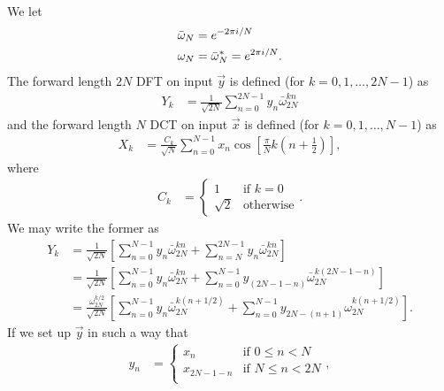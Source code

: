 We let
\begin{subequations}
\begin{align}
	\bar{\omega}_N
	&= e^{-2 \pi i / N} \\
	\omega_N
	&= \bar{\omega}_N^*
	= e^{2 \pi i / N}.
\end{align}
\end{subequations}
The forward length $2 N$ DFT on input $\vec{y}$ is defined (for $k = 0, 1, \ldots, 2 N - 1$) as
\begin{align}
	Y_k
	&= \frac{1}{\sqrt{2 N}} \sum_{n=0}^{2 N - 1} y_n \bar{\omega}_{2 N}^{k n}
\end{align}
and the forward length $N$ DCT on input $\vec{x}$ is defined (for $k = 0, 1, \ldots, N - 1$) as
\begin{align}
	X_k
	&= \frac{C_k}{\sqrt{N}} \sum_{n=0}^{N - 1} x_n \cos{\left[ \frac{\pi}{N} k \left( n + \frac{1}{2} \right) \right]},
		\label{eq:dct}
\end{align}
where
\begin{align}
	C_k
	&= \begin{cases}
			1 & \text{if } k = 0 \\
			\sqrt{2} & \text{otherwise}
		\end{cases}.
\end{align}
We may write the former as
\begin{subequations}
\begin{align}
	Y_k
	&= \frac{1}{\sqrt{2 N}} \left[
			\sum_{n=0}^{N - 1} y_n \bar{\omega}_{2 N}^{k n}
			+ \sum_{n=N}^{2 N - 1} y_n \bar{\omega}_{2 N}^{k n}
		\right] \\
	&= \frac{1}{\sqrt{2 N}} \left[
			\sum_{n=0}^{N - 1} y_n \bar{\omega}_{2 N}^{k n}
			+ \sum_{n=0}^{N - 1} y_{(2 N - 1 - n)} \bar{\omega}_{2 N}^{k (2 N - 1 - n)}
		\right] \\
	&= \frac{\omega_{2 N}^{k/2}}{\sqrt{2 N}} \left[
			\sum_{n=0}^{N - 1} y_n \bar{\omega}_{2 N}^{k (n + 1/2)}
			+ \sum_{n=0}^{N - 1} y_{2 N - (n + 1)} \omega_{2 N}^{k (n + 1/2)}
		\right].
\end{align}
\end{subequations}
If we set up $\vec{y}$ in such a way that
\begin{align}
	y_n
	&= \begin{cases}
			x_n & \text{if } 0 \le n < N \\
			x_{2 N - 1 - n} & \text{if } N \le n < 2 N \\
		\end{cases},
\end{align}

